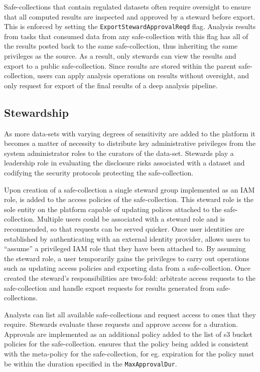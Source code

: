 Safe-collections that contain regulated datasets often require oversight to ensure that all computed results
are inspected and approved by a steward before export. This is enforced by setting the
\texttt{ExportStewardApprovalReqd} flag.
Analysis results from tasks that consumed data from any safe-collection with this flag has all of the
results posted back to the same safe-collection, thus inheriting the same privileges as the source.
As a result, only stewards can view the results and export to a public safe-collection. Since results are
stored within the parent safe-collection, users can apply analysis operations on results without oversight,
and only request for export of the final results of a deep analysis pipeline.

\subsection{Stewardship}

As more data-sets with varying degrees of sensitivity are added to the \NAME platform it becomes a matter
of necessity to distribute key administrative privileges from the system administrator roles to the curators
of the data-set. Stewards play a leadership role in evaluating the disclosure risks associated with a
dataset and codifying the security protocols protecting the safe-collection.

Upon creation of a safe-collection a single steward group implemented as an IAM role, is added to the
access policies of the safe-collection. This steward role is the sole entity on the platform capable of
updating polices attached to the safe-collection.
Multiple users could be associated with a steward role and is recommended, so that requests can be served quicker.
Once user identities are established by authenticating with an external identity provider,
\NAME allows users to ``assume'' a privileged IAM role that they have been attached to.
By assuming the steward role, a user temporarily gains the privileges to carry out operations such
as updating access policies and exporting data from a safe-collection.
Once created the steward's responsibilities are two-fold: arbitrate access requests to the safe-collection and
handle export requests for results generated from safe-collections.

Analysts can list all available safe-collections and request access to ones that they require.
Stewards evaluate these requests and approve access for a duration. Approvals are implemented as an additional
policy added to the list of s3 bucket policies for the safe-collection. \NAME ensures that the policy
being added is consistent with the meta-policy for the safe-collection, for eg. expiration for the policy
must be within the duration specified in the \texttt{MaxApprovalDur}.

